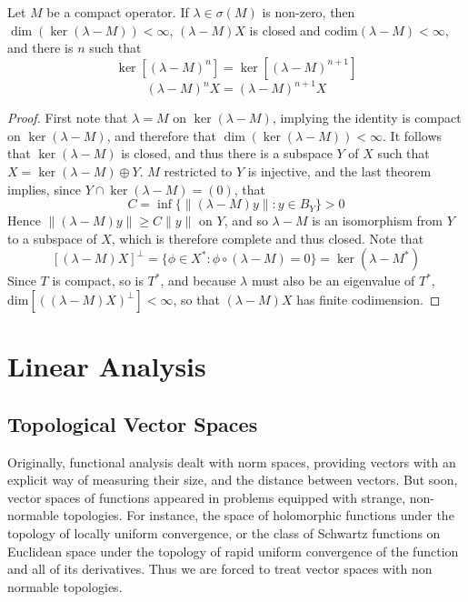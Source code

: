 \begin{corollary}
    Let $M$ be a compact operator. If $\lambda \in \sigma(M)$ is non-zero, then $\dim(\ker(\lambda - M)) < \infty$, $(\lambda - M)X$ is closed and $\text{codim}(\lambda - M) < \infty$, and there is $n$ such that
    \[ \ker[(\lambda - M)^n] = \ker[(\lambda - M)^{n+1}] \]
    \[ (\lambda - M)^n X = (\lambda - M)^{n+1} X \]
\end{corollary}
\begin{proof}
    First note that $\lambda = M$ on $\ker(\lambda - M)$, implying the identity is compact on $\ker(\lambda - M)$, and therefore that $\dim(\ker(\lambda - M)) < \infty$. It follows that $\ker(\lambda - M)$ is closed, and thus there is a subspace $Y$ of $X$ such that $X = \ker(\lambda - M) \oplus Y$. $M$ restricted to $Y$ is injective, and the last theorem implies, since $Y \cap \ker(\lambda - M) = (0)$, that
    \[ C = \inf \{ \| (\lambda - M)y \| : y \in B_Y \} > 0 \]
    Hence $\| (\lambda - M)y \| \geq C \|y\|$ on $Y$, and so $\lambda - M$ is an isomorphism from $Y$ to a subspace of $X$, which is therefore complete and thus closed. Note that
    \[ [(\lambda - M)X]^\perp = \{ \phi \in X^*: \phi \circ (\lambda - M) = 0 \} = \ker( \lambda - M^*) \]
    Since $T$ is compact, so is $T^*$, and because $\lambda$ must also be an eigenvalue of $T^*$, $\text{dim}[((\lambda - M)X)^\perp] < \infty$, so that $(\lambda - M)X$ has finite codimension.
\end{proof}









\part{Linear Analysis}

\chapter{Topological Vector Spaces}

Originally, functional analysis dealt with norm spaces, providing vectors with an explicit way of measuring their size, and the distance between vectors. But soon, vector spaces of functions appeared in problems equipped with strange, non-normable topologies. For instance, the space of holomorphic functions under the topology of locally uniform convergence, or the class of Schwartz functions on Euclidean space under the topology of rapid uniform convergence of the function and all of its derivatives. Thus we are forced to treat vector spaces with non normable topologies.

